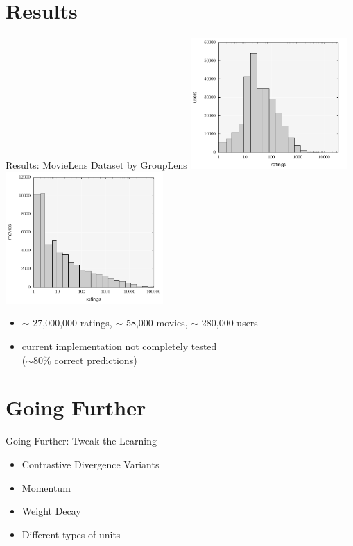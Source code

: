 \documentclass[aspectratio=169]{beamer}
\begin{document}
  \section{Results} %
  \label{sec:results}
    \begin{frame}{Results: MovieLens Dataset by GroupLens}
      \includegraphics[width=0.45\textwidth]{figures/movielens-user-histogram.pdf}
      \hfill
      \includegraphics[width=0.45\textwidth]{figures/movielens-movie-histogram.pdf}
      \vfill
      \begin{itemize}
        \item $\sim$ 27,000,000 ratings, $\sim$ 58,000 movies, $\sim$ 280,000 users
        \item current implementation not completely tested \\ ($\sim 80\%$ correct predictions)
      \end{itemize}
    \end{frame}

  \section{Going Further} %
  \label{sec:Going Further}
    \begin{frame}{Going Further: Tweak the Learning}
      \begin{itemize}
        \item Contrastive Divergence Variants
        \item Momentum
        \item Weight Decay
        \item Different types of units
      \end{itemize}
    \end{frame}
\end{document}
